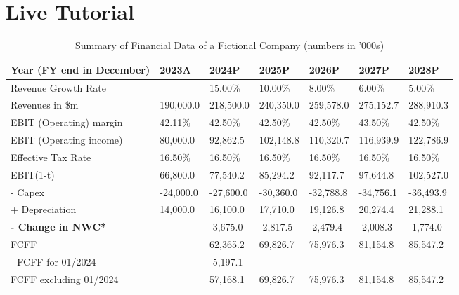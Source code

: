 \section{Live Tutorial}


\begin{table}[]
    \centering
    \small
    \caption{Summary of Financial Data of a Fictional Company (numbers in '000s)}
    \label{tab:fin_data_live}
    \begin{tabular}{@{}lllllll@{}}
    \toprule
    \textbf{Year (FY end in December)} & \textbf{2023A} & \textbf{2024P} & \textbf{2025P} & \textbf{2026P} & \textbf{2027P} & \textbf{2028P} \\ \midrule
    Revenue Growth Rate                  &           & 15.00\%     & 10.00\%   & 8.00\%        & 6.00\%    & 5.00\%      \\\midrule
    Revenues in \$m                    & 190,000.0      & 218,500.0      & 240,350.0      & 259,578.0      & 275,152.7      & 288,910.3      \\
    EBIT (Operating) margin              & 42.11\%   & 42.50\%     & 42.50\%   & 42.50\%       & 43.50\%   & 42.50\%     \\
    EBIT (Operating income)            & 80,000.0       & 92,862.5       & 102,148.8      & 110,320.7      & 116,939.9      & 122,786.9      \\
    Effective Tax Rate                   & 16.50\%   & 16.50\%     & 16.50\%   & 16.50\%       & 16.50\%   & 16.50\%     \\\midrule
    EBIT(1-t)                            & 66,800.0  & 77,540.2    & 85,294.2  & 92,117.7      & 97,644.8  & 102,527.0   \\
    - Capex                              & -24,000.0 & -27,600.0   & -30,360.0 & -32,788.8     & -34,756.1 & -36,493.9   \\
    + Depreciation                       & 14,000.0  & 16,100.0    & 17,710.0  & 19,126.8      & 20,274.4  & 21,288.1    \\
    \textbf{- Change in NWC*}            &           & -3,675.0    & -2,817.5  & -2,479.4      & -2,008.3  & -1,774.0    \\\midrule[2pt]
    FCFF                                 &           & 62,365.2    & 69,826.7  & 75,976.3      & 81,154.8  & 85,547.2    \\
    - FCFF for 01/2024                   &           & -5,197.1    &           &               &           &             \\
    FCFF excluding 01/2024               &           & 57,168.1    & 69,826.7  & 75,976.3      & 81,154.8  & 85,547.2    \\\midrule[2pt]

\end{tabular}
\end{table}
